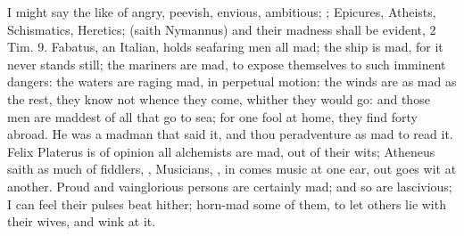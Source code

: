 I might say the like of angry, peevish, envious, ambitious; 
; Epicures, Atheists, Schismatics,
Heretics;  (saith Nymannus) and
their madness shall be evident, 2 Tim.  9. Fabatus, an
Italian, holds seafaring men all mad; the ship is mad, for it never
stands still; the mariners are mad, to expose themselves to such
imminent dangers: the waters are raging mad, in perpetual motion: the
winds are as mad as the rest, they know not whence they come, whither
they would go: and those men are maddest of all that go to sea; for one
fool at home, they find forty abroad. He was a madman that said it, and
thou peradventure as mad to read it.  Felix Platerus is of opinion
all alchemists are mad, out of their wits; Atheneus saith as much
of fiddlers, ,  Musicians, , in comes music at one
ear, out goes wit at another. Proud and vainglorious persons are
certainly mad; and so are lascivious; I can feel their pulses beat
hither; horn-mad some of them, to let others lie with their wives, and
wink at it.

